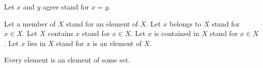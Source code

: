 \begin{forthel}

  Let $x$ and $y$ agree stand for $x = y$.

  Let a member of $X$ stand for an element of $X$.
  Let $x$ belongs to $X$ stand for $x \in X$.
  Let $X$ contains $x$ stand for $x \in X$.
  Let $x$ is contained in $X$ stand for $x \in X$.
  Let $x$ lies in $X$ stand for $x$ is an element of $X$.

  \begin{axiom}
    Every element is an element of some set.
  \end{axiom}
\end{forthel}
